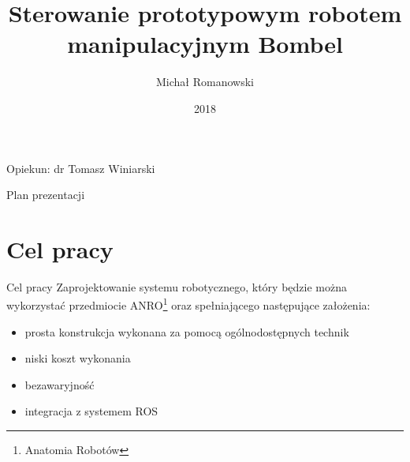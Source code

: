 \documentclass{beamer}
\title[]{Sterowanie prototypowym robotem manipulacyjnym Bombel}
\author{Michał Romanowski}
\date{2018}
\begin{document}
\begin{frame}
  \titlepage
  \begin{center}
	 Opiekun: dr Tomasz Winiarski
  \end{center}
\end{frame}

\begin{frame}{Plan prezentacji}
  \tableofcontents
\end{frame}


\section{Cel pracy}
\begin{frame}{Cel pracy}
	Zaprojektowanie systemu robotycznego, który będzie można wykorzystać przedmiocie ANRO\footnote{Anatomia Robotów}  oraz spełniającego następujące założenia:
	\\
	\begin{itemize}
		\item {
			prosta konstrukcja wykonana za pomocą ogólnodostępnych technik
		}
		\item{
			niski koszt wykonania		
		}
		
		\item{
			bezawaryjność	
		}
		
		\item{
			integracja z systemem ROS	
		}
		
	\end{itemize}
\end{frame}
\end{document}
